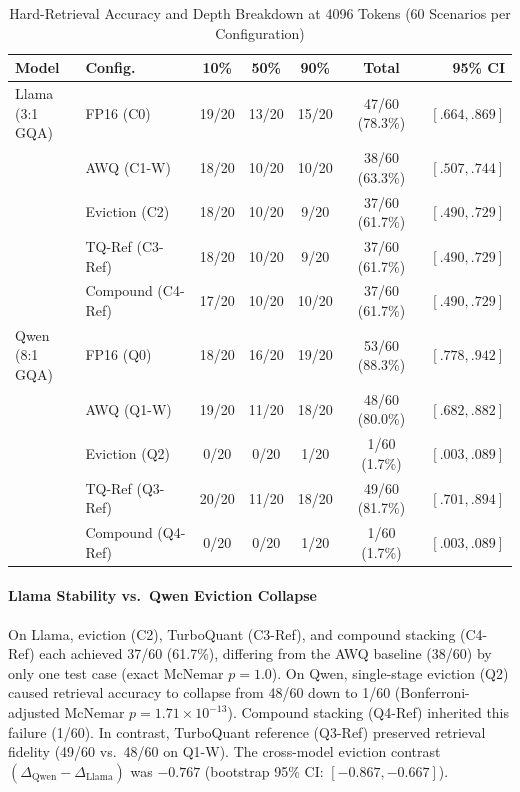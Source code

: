 \documentclass[conference,a4paper]{IEEEtran}
\begin{document}
\begin{table}[t]
\caption{Hard-Retrieval Accuracy and Depth Breakdown at 4096 Tokens (60 Scenarios per Configuration)}
\label{tab:quality}
\centering\footnotesize
\setlength{\tabcolsep}{0.4pt}
\renewcommand{\arraystretch}{0.80}
\begin{tabular*}{\columnwidth}{@{\extracolsep{\fill}}llccccr@{}}
\toprule
\textbf{Model} & \textbf{Config.} & \textbf{10\%} & \textbf{50\%} & \textbf{90\%} & \textbf{Total} & \textbf{95\% CI} \\
\midrule
\shortstack[l]{Llama\\(3:1 GQA)} & FP16 (C0)      & 19/20 & 13/20 & 15/20 & 47/60 (78.3\%) & $[.664,.869]$ \\
               & AWQ (C1-W)             & 18/20 & 10/20 & 10/20 & 38/60 (63.3\%) & $[.507,.744]$ \\
               & Eviction (C2)          & 18/20 & 10/20 &  9/20 & 37/60 (61.7\%) & $[.490,.729]$ \\
               & TQ-Ref (C3-Ref)        & 18/20 & 10/20 &  9/20 & 37/60 (61.7\%) & $[.490,.729]$ \\
               & Compound (C4-Ref)      & 17/20 & 10/20 & 10/20 & 37/60 (61.7\%) & $[.490,.729]$ \\
\midrule
\shortstack[l]{Qwen\\(8:1 GQA)} & FP16 (Q0)      & 18/20 & 16/20 & 19/20 & 53/60 (88.3\%) & $[.778,.942]$ \\
               & AWQ (Q1-W)             & 19/20 & 11/20 & 18/20 & 48/60 (80.0\%) & $[.682,.882]$ \\
               & Eviction (Q2)          &  0/20 &  0/20 &  1/20 &  1/60 (1.7\%)  & $[.003,.089]$ \\
               & TQ-Ref (Q3-Ref)        & 20/20 & 11/20 & 18/20 & 49/60 (81.7\%) & $[.701,.894]$ \\
               & Compound (Q4-Ref)      &  0/20 &  0/20 &  1/20 &  1/60 (1.7\%)  & $[.003,.089]$ \\
\bottomrule
\end{tabular*}
\end{table}

\paragraph{Llama Stability vs.\ Qwen Eviction Collapse}
On Llama, eviction (C2), TurboQuant (C3-Ref), and compound stacking (C4-Ref) each achieved 37/60 (61.7\%), differing from the AWQ baseline (38/60) by only one test case (exact McNemar $p = 1.0$). On Qwen, single-stage eviction (Q2) caused retrieval accuracy to collapse from 48/60 down to 1/60 (Bonferroni-adjusted McNemar $p = 1.71 \times 10^{-13}$). Compound stacking (Q4-Ref) inherited this failure (1/60). In contrast, TurboQuant reference (Q3-Ref) preserved retrieval fidelity (49/60 vs.\ 48/60 on Q1-W). The cross-model eviction contrast $(\Delta_{\text{Qwen}} - \Delta_{\text{Llama}})$ was $-0.767$ (bootstrap 95\% CI: $[-0.867, -0.667]$).
\end{document}
